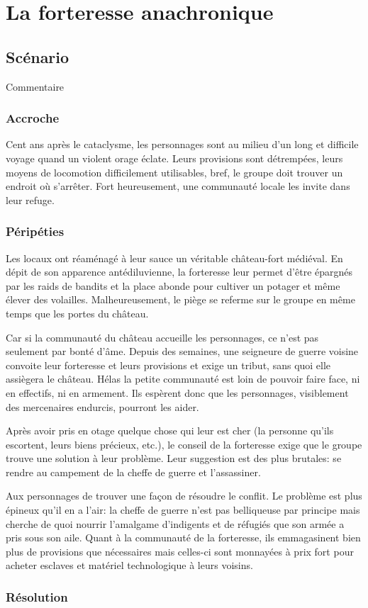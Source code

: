 \chapter{La forteresse anachronique}

\section{Scénario}

Commentaire

\subsection{Accroche}

Cent ans après le cataclysme, les personnages sont au milieu d'un long et difficile voyage quand un violent orage éclate.
Leurs provisions sont détrempées, leurs moyens de locomotion difficilement utilisables, bref, le groupe doit trouver un endroit où s'arrêter.
Fort heureusement, une communauté locale les invite dans leur refuge.


\subsection{Péripéties}

Les locaux ont réaménagé à leur sauce un véritable château-fort médiéval.
En dépit de son apparence antédiluvienne, la forteresse leur permet d'être épargnés par les raids de bandits et la place abonde pour cultiver un potager et même élever des volailles.
Malheureusement, le piège se referme sur le groupe en même temps que les portes du château.

Car si la communauté du château accueille les personnages, ce n'est pas seulement par bonté d'âme.
Depuis des semaines, une seigneure de guerre voisine convoite leur forteresse et leurs provisions et exige un tribut, sans quoi elle assiègera le château.
Hélas la petite communauté est loin de pouvoir faire face, ni en effectifs, ni en armement.
Ils espèrent donc que les personnages, visiblement des mercenaires endurcis, pourront les aider.

Après avoir pris en otage quelque chose qui leur est cher (la personne qu'ils escortent, leurs biens précieux, etc.), le conseil de la forteresse exige que le groupe trouve une solution à leur problème.
Leur suggestion est des plus brutales: se rendre au campement de la cheffe de guerre et l'assassiner.

Aux personnages de trouver une façon de résoudre le conflit.
Le problème est plus épineux qu'il en a l'air: la cheffe de guerre n'est pas belliqueuse par principe mais cherche de quoi nourrir l'amalgame d'indigents et de réfugiés que son armée a pris sous son aile.
Quant à la communauté de la forteresse, ils emmagasinent bien plus de provisions que nécessaires mais celles-ci sont monnayées à prix fort pour acheter esclaves et matériel technologique à leurs voisins.

\subsection{Résolution}
